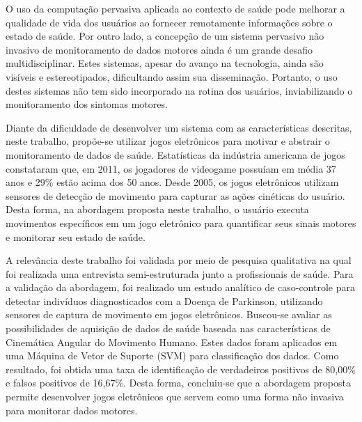 O uso da computação pervasiva aplicada ao contexto de saúde pode melhorar a qualidade de vida dos usuários ao fornecer remotamente informações sobre o estado de saúde. Por outro lado, a concepção de um sistema pervasivo não invasivo de monitoramento de dados motores ainda é um grande desafio multidisciplinar. Estes sistemas, apesar do avanço na tecnologia, ainda são visíveis e estereotipados, dificultando assim sua disseminação. Portanto, o uso destes sistemas não tem sido incorporado na rotina dos usuários, inviabilizando o monitoramento dos sintomas motores.
 
Diante da dificuldade de desenvolver um sistema com as características descritas, neste trabalho, propõe-se utilizar jogos eletrônicos para motivar e abstrair o monitoramento de dados de saúde. Estatísticas da indústria americana de jogos constataram que, em 2011, os jogadores de videogame possuíam em média 37 anos e 29$\%$  estão acima dos 50 anos. Desde 2005, os jogos eletrônicos utilizam sensores de detecção de movimento para capturar as ações cinéticas do usuário. Desta forma, na abordagem proposta neste trabalho, o usuário executa movimentos específicos em um jogo eletrônico para quantificar seus sinais motores e monitorar seu estado de saúde.

A relevância deste trabalho foi validada por meio de pesquisa qualitativa na qual foi realizada uma entrevista semi-estruturada junto a profissionais de saúde. Para a validação da abordagem, foi realizado um estudo analítico de caso-controle para detectar indivíduos diagnosticados com a Doença de Parkinson, utilizando sensores de captura de movimento em jogos eletrônicos. Buscou-se avaliar as possibilidades de aquisição de dados de saúde baseada nas características de Cinemática Angular do Movimento Humano. Estes dados foram aplicados em uma Máquina de Vetor de Suporte (SVM) para classificação dos dados. Como resultado, foi obtida uma taxa de identificação de verdadeiros positivos de 80,00\% e falsos positivos de 16,67\%. Desta forma, concluiu-se que a abordagem proposta permite desenvolver jogos eletrônicos que servem como uma forma não invasiva para monitorar dados motores.



